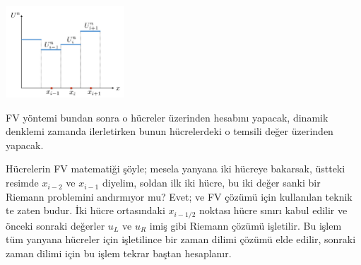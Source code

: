 \documentclass[12pt,fleqn]{article}\usepackage{../../common}
\begin{document}
\includegraphics[width=12em]{12-19-02.png}

FV yöntemi bundan sonra o hücreler üzerinden hesabını yapacak, dinamik denklemi
zamanda ilerletirken bunun hücrelerdeki o temsili değer üzerinden yapacak.

Hücrelerin FV matematiği şöyle; mesela yanyana iki hücreye bakarsak, üstteki
resimde $x_{i-2}$ ve $x_{i-1}$ diyelim, soldan ilk iki hücre, bu iki değer
sanki bir Riemann problemini andırmıyor mu? Evet; ve FV çözümü için kullanılan
teknik te zaten budur. İki hücre ortasındaki $x_{i-1/2}$ noktası hücre sınırı
kabul edilir ve önceki sonraki değerler $u_L$ ve $u_R$ imiş gibi Riemann
çözümü işletilir. Bu işlem tüm yanyana hücreler için işletilince bir
zaman dilimi çözümü elde edilir, sonraki zaman dilimi için bu işlem
tekrar baştan hesaplanır.
\end{document}
